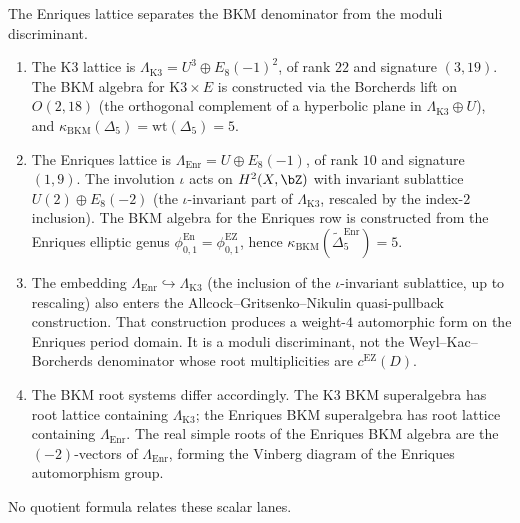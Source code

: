 \begin{remark}
\label{rem:enriques-bkm-lattice}
The Enriques lattice separates the BKM denominator from the moduli
discriminant.
\begin{enumerate}[label=\textup{(\arabic*)}]
 \item The K3 lattice is $\Lambda_{\mathrm{K3}} = U^3 \oplus E_8(-1)^2$, of rank $22$ and signature $(3, 19)$. The BKM algebra for $\mathrm{K3} \times E$ is constructed via the Borcherds lift on $O(2, 18)$ (the orthogonal complement of a hyperbolic plane in $\Lambda_{\mathrm{K3}} \oplus U$), and $\kappa_{\mathrm{BKM}}(\Delta_5) = \mathrm{wt}(\Delta_5) = 5$.
 \item The Enriques lattice is $\Lambda_{\mathrm{Enr}} = U \oplus E_8(-1)$, of rank $10$ and signature $(1, 9)$. The involution $\iota$ acts on $H^2(X, \bZ)$ with invariant sublattice $U(2) \oplus E_8(-2)$ (the $\iota$-invariant part of $\Lambda_{\mathrm{K3}}$, rescaled by the index-$2$ inclusion). The BKM algebra for the Enriques row is constructed from the Enriques elliptic genus \(\phi^{\mathrm{En}}_{0,1}=\phi^{\mathrm{EZ}}_{0,1}\), hence \(\kappa_{\mathrm{BKM}}(\widetilde\Delta^{\mathrm{Enr}}_5)=5\).
 \item The embedding $\Lambda_{\mathrm{Enr}} \hookrightarrow \Lambda_{\mathrm{K3}}$ (the inclusion of the $\iota$-invariant sublattice, up to rescaling) also enters the Allcock--Gritsenko--Nikulin quasi-pullback construction. That construction produces a weight-$4$ automorphic form on the Enriques period domain. It is a moduli discriminant, not the Weyl--Kac--Borcherds denominator whose root multiplicities are \(c^{\mathrm{EZ}}(D)\).
 \item The BKM root systems differ accordingly. The K3 BKM superalgebra has root lattice containing $\Lambda_{\mathrm{K3}}$; the Enriques BKM superalgebra has root lattice containing $\Lambda_{\mathrm{Enr}}$. The real simple roots of the Enriques BKM algebra are the $(-2)$-vectors of $\Lambda_{\mathrm{Enr}}$, forming the Vinberg diagram of the Enriques automorphism group.
\end{enumerate}
No quotient formula relates these scalar lanes.
\end{remark}


